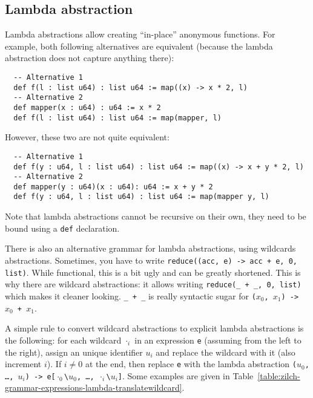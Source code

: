 \subsection{Lambda abstraction}\label{subsec:zilch-grammar-expressions-lambda}

Lambda abstractions allow creating ``in-place'' anonymous functions.
For example, both following alternatives are equivalent (because the lambda abstraction does not capture anything there):\\
\begin{verbatim}
  -- Alternative 1
  def f(l : list u64) : list u64 := map((x) -> x * 2, l)
  -- Alternative 2
  def mapper(x : u64) : u64 := x * 2
  def f(l : list u64) : list u64 := map(mapper, l)
\end{verbatim}
\vspace*{\baselineskip}

\noindent However, these two are not quite equivalent:\\
\begin{verbatim}
  -- Alternative 1
  def f(y : u64, l : list u64) : list u64 := map((x) -> x + y * 2, l)
  -- Alternative 2
  def mapper(y : u64)(x : u64): u64 := x + y * 2
  def f(y : u64, l : list u64) : list u64 := map(mapper y, l)
\end{verbatim}
\vspace*{\baselineskip}

\noindent Note that lambda abstractions cannot be recursive on their own, they need to be bound using a \texttt{def} declaration.

There is also an alternative grammar for lambda abstractions, using wildcards abstractions.
Sometimes, you have to write \verb|reduce((acc, e) -> acc + e, 0, list)|.
While functional, this is a bit ugly and can be greatly shortened.
This is why there are wildcard abstractions: it allows writing \verb|reduce(_ + _, 0, list)| which makes it cleaner looking.
\verb|_ + _| is really syntactic sugar for \texttt{($x_0$, $x_1$) -> $x_0$ + $x_1$}.

A simple rule to convert wildcard abstractions to explicit lambda abstractions is the following: for each wildcard $\cdot_i$ in an expression \verb|e| (assuming from the left to the right), assign an unique identifier $u_i$ and replace the wildcard with it (also increment $i$). If $i \neq 0$ at the end, then replace \verb|e| with the lambda abstraction \texttt{($u_0$, \ldots, $u_i$) -> e[$\cdot_0$\textbackslash$u_0$, \ldots, $\cdot_i$\textbackslash$u_i$]}.
Some examples are given in Table~\ref{table:zilch-grammar-expressions-lambda-translatewildcard}.


